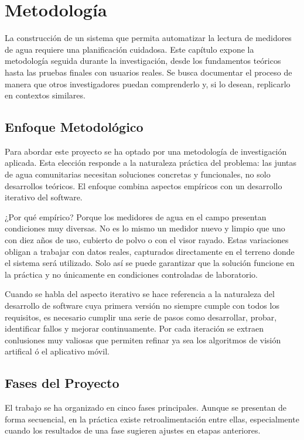 \chapter{Metodología}
\label{ch:methodology}

La construcción de un sistema que permita automatizar la lectura de medidores de agua requiere una planificación cuidadosa. Este capítulo expone la metodología seguida durante la investigación, desde los fundamentos teóricos hasta las pruebas finales con usuarios reales. Se busca documentar el proceso de manera que otros investigadores puedan comprenderlo y, si lo desean, replicarlo en contextos similares.

\section{Enfoque Metodológico}
\label{sec:methodological_approach}

Para abordar este proyecto se ha optado por una metodología de investigación aplicada. Esta elección responde a la naturaleza práctica del problema: las juntas de agua comunitarias necesitan soluciones concretas y funcionales, no solo desarrollos teóricos. El enfoque combina aspectos empíricos con un desarrollo iterativo del software.

¿Por qué empírico? Porque los medidores de agua en el campo presentan condiciones muy diversas. No es lo mismo un medidor nuevo y limpio que uno con diez años de uso, cubierto de polvo o con el visor rayado. Estas variaciones obligan a trabajar con datos reales, capturados directamente en el terreno donde el sistema será utilizado. Solo así se puede garantizar que la solución funcione en la práctica y no únicamente en condiciones controladas de laboratorio.

Cuando se habla del aspecto iterativo se hace referencia a la naturaleza del desarrollo de software cuya primera versión no siempre cumple con todos los requisitos, es necesario cumplir una serie de pasos como desarrollar, probar, identificar fallos y mejorar continuamente. Por cada iteración se extraen conlusiones muy valiosas que permiten refinar ya sea los algoritmos de visión artifical ó el aplicativo móvil.

\section{Fases del Proyecto}
\label{sec:project_phases}

El trabajo se ha organizado en cinco fases principales. Aunque se presentan de forma secuencial, en la práctica existe retroalimentación entre ellas, especialmente cuando los resultados de una fase sugieren ajustes en etapas anteriores.

